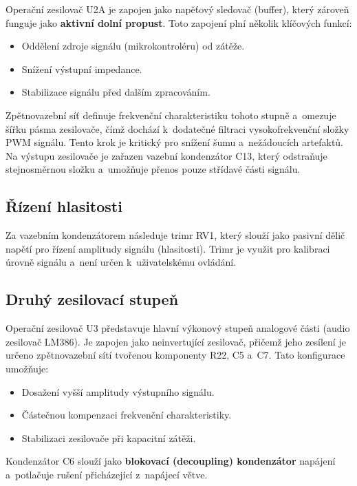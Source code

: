 \documentclass[11pt, a4paper, plain]{article}
\begin{document}
Operační zesilovač U2A je zapojen jako napěťový sledovač (buffer), který zároveň funguje jako
\textbf{aktivní dolní propust}. Toto zapojení plní několik klíčových funkcí:

\begin{itemize}
    \item Oddělení zdroje signálu (mikrokontroléru) od zátěže.
    \item Snížení výstupní impedance.
    \item Stabilizace signálu před dalším zpracováním.
\end{itemize}

Zpětnovazební síť definuje frekvenční charakteristiku tohoto stupně a~omezuje šířku pásma
zesilovače, čímž dochází k~dodatečné filtraci vysokofrekvenční složky PWM signálu. Tento krok je
kritický pro snížení šumu a~nežádoucích artefaktů. Na výstupu zesilovače je zařazen vazební
kondenzátor C13, který odstraňuje stejnosměrnou složku a~umožňuje přenos pouze střídavé části
signálu.

\subsection*{Řízení hlasitosti}

Za vazebním kondenzátorem následuje trimr RV1, který slouží jako pasivní dělič napětí
pro řízení amplitudy signálu (hlasitosti). Trimr je využit pro kalibraci úrovně signálu
a~není určen k~uživatelskému ovládání.

\subsection*{Druhý zesilovací stupeň}

Operační zesilovač U3 představuje hlavní výkonový stupeň analogové části (audio zesilovač LM386). Je
zapojen jako neinvertující zesilovač, přičemž jeho zesílení je určeno zpětnovazební sítí
tvořenou komponenty R22, C5 a~C7. Tato konfigurace umožňuje:

\begin{itemize}
    \item Dosažení vyšší amplitudy výstupního signálu.
    \item Částečnou kompenzaci frekvenční charakteristiky.
    \item Stabilizaci zesilovače při kapacitní zátěži.
\end{itemize}

Kondenzátor C6 slouží jako \textbf{blokovací (decoupling) kondenzátor} napájení a~potlačuje
rušení přicházející z~napájecí větve.
\end{document}

